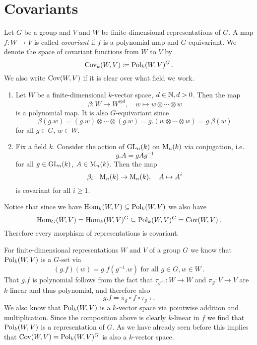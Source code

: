 \section{Covariants}


\begin{definition}
  Let $G$ be a group and $V$ and $W$ be finite-dimensional representations of $G$.
  A map $f \colon W \to V$ is called \emph{covariant} if $f$ is a polynomial map and $G$-equivariant.
  We denote the space of covariant functions from $W$ to $V$ by
  \[
              \operatorname{Cov}_k(W,V)
    \coloneqq \operatorname{Pol}_k(W,V)^G \,.
  \]
  We also write $\operatorname{Cov}(W,V)$ if it is clear over what field we work.
\end{definition}


\begin{example}
  \begin{enumerate}[label=\emph{\alph*)},leftmargin=*]
    \item
      Let $W$ be a finite-dimensional $k$-vector space, $d \in \mathbb{N}, d > 0$.
      Then the map
      \[
                \beta
        \colon  W \to W^{\otimes d},
        \quad   w
        \mapsto w \otimes \dotsb \otimes w
      \]
      is a polynomial map.
      It is also $G$-equivariant since
      \[
          \beta(g.w)
        = (g.w) \otimes \dotsb \otimes (g.w)
        = g.(w \otimes \dotsb \otimes w)
        = g.\beta(w)
      \]
      for all $g \in G$, $w \in W$.
    \item
      Fix a field $k$.
      Consider the action of $\operatorname{GL}_n(k)$ on $\operatorname{M}_n(k)$ via conjugation, i.e.\
      \[
          g.A
        = gAg^{-1}
      \]
      for all $g \in \operatorname{GL}_n(k)$, $A \in \operatorname{M}_n(k)$.
      Then the map
      \[
                \beta_i 
        \colon  \operatorname{M}_n(k) 
        \to     \operatorname{M}_n(k),
        \quad   A
        \mapsto A^i
      \]
      is covariant for all $i \geq 1$. 
  \end{enumerate}
\end{example}


Notice that since we have $\operatorname{Hom}_k(W,V) \subseteq \operatorname{Pol}_k(W,V)$ we also have
\[
            \operatorname{Hom}_G(W,V)
  =         \operatorname{Hom}_k(W,V)^G
  \subseteq \operatorname{Pol}_k(W,V)^G
  =         \operatorname{Cov}(W,V) \,.
\]
Therefore every morphism of representations is covariant.


For finite-dimensional representations $W$ and $V$ of a group $G$ we know that $\operatorname{Pol}_k(W,V)$ is a $G$-set via
\[
    (g.f)(w)
  = g.f\left( g^{-1}.w \right)
  \text{ for all }
  g \in G,
  w \in W \,.
\]
That $g.f$ is polynomial follows from the fact that $\tau_{g^{-1}} \colon W \to W$ and $\pi_g \colon V \to V$ are $k$-linear and thus polynomial, and therefore also
\[
    g.f
  = \pi_g \circ f \circ \tau_{g^{-1}} \,.
\]
We also know that $\operatorname{Pol}_k(W,V)$ is a $k$-vector space via pointwise addition and multiplication.
Since the composition above is clearly $k$-linear in $f$ we find that $\operatorname{Pol}_k(W,V)$ is a representation of $G$.
As we have already seen before this implies that $\operatorname{Cov}(W,V) = \operatorname{Pol}_k(W,V)^G$ is also a $k$-vector space.


